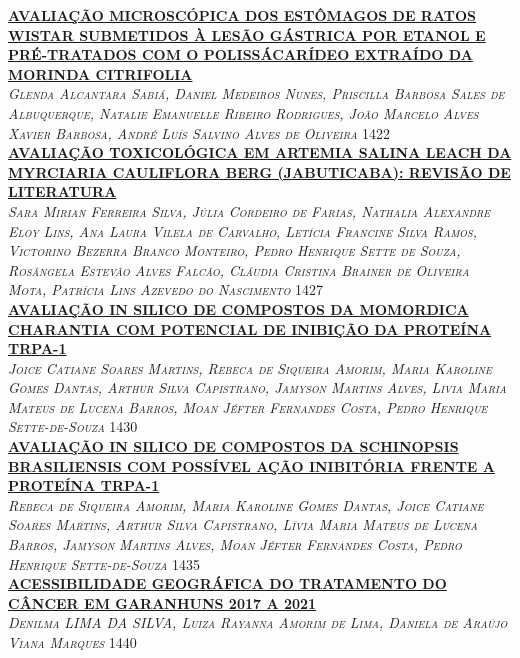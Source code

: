 \noindent \textsc{\hyperlink{trabalhos/251440.pdf.1}{\textbf{AVALIAÇÃO MICROSCÓPICA DOS ESTÔMAGOS DE RATOS WISTAR SUBMETIDOS À LESÃO GÁSTRICA POR ETANOL E PRÉ-TRATADOS COM O POLISSÁCARÍDEO EXTRAÍDO DA MORINDA CITRIFOLIA}}}\\ 
\noindent \textsc{\textit{Glenda Alcantara Sabiá, Daniel Medeiros Nunes, Priscilla Barbosa Sales de Albuquerque, Natalie Emanuelle Ribeiro Rodrigues, João Marcelo Alves Xavier Barbosa, André Luís Salvino Alves de Oliveira}} \hfill 1422\\ 

\noindent \textsc{\hyperlink{trabalhos/251658.pdf.1}{\textbf{AVALIAÇÃO TOXICOLÓGICA EM ARTEMIA SALINA LEACH DA MYRCIARIA CAULIFLORA BERG (JABUTICABA): REVISÃO DE LITERATURA}}}\\ 
\noindent \textsc{\textit{Sara Mirian Ferreira Silva, Júlia Cordeiro de Farias, Nathalia Alexandre Eloy Lins, Ana Laura Vilela de Carvalho, Letícia Francine Silva Ramos, Victorino Bezerra Branco Monteiro, Pedro Henrique Sette de Souza, Rosângela Estevão Alves Falcão, Cláudia Cristina Brainer de Oliveira Mota, Patrícia Lins Azevedo do Nascimento}} \hfill 1427\\ 

\noindent \textsc{\hyperlink{trabalhos/250547.pdf.1}{\textbf{AVALIAÇÃO IN SILICO DE COMPOSTOS DA MOMORDICA CHARANTIA COM POTENCIAL DE INIBIÇÃO DA PROTEÍNA TRPA-1}}}\\ 
\noindent \textsc{\textit{Joice Catiane Soares Martins, Rebeca de Siqueira Amorim, Maria Karoline Gomes Dantas, Arthur Silva Capistrano, Jamyson Martins Alves, Livia Maria Mateus de Lucena Barros, Moan Jéfter Fernandes Costa, Pedro Henrique Sette-de-Souza}} \hfill 1430\\ 

\noindent \textsc{\hyperlink{trabalhos/250704.pdf.1}{\textbf{AVALIAÇÃO IN SILICO DE COMPOSTOS DA SCHINOPSIS BRASILIENSIS COM POSSÍVEL AÇÃO INIBITÓRIA FRENTE A PROTEÍNA TRPA-1}}}\\ 
\noindent \textsc{\textit{Rebeca de Siqueira Amorim, Maria Karoline Gomes Dantas, Joice Catiane Soares Martins, Arthur Silva Capistrano, Lívia Maria Mateus de Lucena Barros, Jamyson Martins Alves, Moan Jéfter Fernandes Costa, Pedro Henrique Sette-de-Souza}} \hfill 1435\\ 

\noindent \textsc{\hyperlink{trabalhos/250272.pdf.1}{\textbf{ACESSIBILIDADE GEOGRÁFICA DO TRATAMENTO DO CÂNCER EM GARANHUNS 2017 A 2021}}}\\ 
\noindent \textsc{\textit{Denilma LIMA DA SILVA, Luiza Rayanna Amorim de Lima, Daniela de Araújo Viana Marques}} \hfill 1440\\ 

